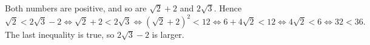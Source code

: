 Both numbers are positive, and so are $\sqrt2+2$ and $2\sqrt3$. Hence
\[\sqrt2<2\sqrt3-2\iff\sqrt2+2<2\sqrt3\iff\left(\sqrt2+2\right)^2<12\iff6+4\sqrt2<12\iff4\sqrt2<6\iff32<36.\]
The last inequality is true, so $\boxed{2\sqrt3-2}$ is larger.
